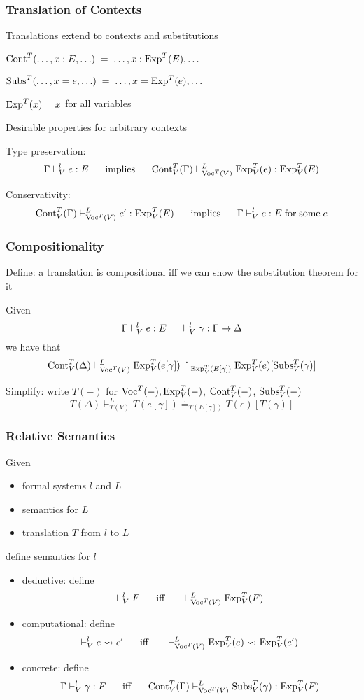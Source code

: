 \begin{frame}\frametitle{Translation of Contexts}
\begin{blockitems}{Translations extend to contexts and substitutions}
 \item $\mathrm{Cont}^T(\ldots,x:E,\ldots) \;=\;\ldots, x:\mathrm{Exp}^T(E), \ldots$
 \item $\mathrm{Subs}^T(\ldots,x=e,\ldots) \;=\;\ldots, x=\mathrm{Exp}^T(e), \ldots$
 \item $\mathrm{Exp}^T(x)=x$ for all variables
\end{blockitems}

\begin{blockitems}{Desirable properties for arbitrary contexts}
\item Type preservation:
\[\Gamma\vdash^l_V e:E \hspace*{.5cm}\;\mathrm{implies}\;\hspace*{.5cm} \mathrm{Cont}^T_V(\Gamma)\vdash^L_{\mathrm{Voc}^T(V)} \mathrm{Exp}^T_V(e):\mathrm{Exp}^T_V(E)\]
\item Conservativity:
\[\mathrm{Cont}^T_V(\Gamma)\vdash^L_{\mathrm{Voc}^T(V)} e':\mathrm{Exp}^T_V(E) \hspace*{.5cm}\;\mathrm{implies}\;\hspace*{.5cm} \Gamma\vdash^l_V e:E \;\mathrm{for}\;\mathrm{some}\; e\]
\end{blockitems}
\end{frame}

\begin{frame}\frametitle{Compositionality}
Define: a translation is compositional iff we can show the substitution theorem for it

Given
\[\Gamma\vdash^l_V e:E \hspace*{.5cm}\vdash^l_V \gamma:\Gamma\to\Delta\]
we have that
\[\mathrm{Cont}^T_V(\Delta)\vdash^L_{\mathrm{Voc}^T(V)}\mathrm{Exp}^T_V(e[\gamma])\doteq_{\mathrm{Exp}^T_V(E[\gamma])}\mathrm{Exp}^T_V(e)[\mathrm{Subs}^T_V(\gamma)] \]

Simplify: write
$T(-)$ for $\mathrm{Voc}^T(-), \mathrm{Exp}_V^T(-)$, $\mathrm{Cont}_V^T(-)$, $\mathrm{Subs}_V^T(-)$
\[T(\Delta)\vdash^L_{T(V)}T(e[\gamma])\doteq_{T(E[\gamma])}T(e)[T(\gamma)] \]
\end{frame}

\begin{frame}\frametitle{Relative Semantics}
Given
 \begin{itemize}
 \item formal systems $l$ and $L$
 \item semantics for $L$
 \item translation $T$ from $l$ to $L$
 \end{itemize}
define semantics for $l$
\medskip

\begin{itemize}
\item deductive: define
 \[\vdash^l_V F \hspace*{.5cm}\;\mathrm{iff}\;\hspace*{.5cm} \vdash^L_{\mathrm{Voc}^T(V)} \mathrm{Exp}^T_V(F) \]
\item computational: define
 \[\vdash^l_V e\rightsquigarrow e' \hspace*{.5cm}\;\mathrm{iff}\;\hspace*{.5cm} \vdash^L_{\mathrm{Voc}^T(V)}\mathrm{Exp}^T_V(e)\rightsquigarrow \mathrm{Exp}^T_V(e')\]
\item concrete: define
 \[\Gamma\vdash^l_V \gamma:F \hspace*{.5cm}\;\mathrm{iff}\;\hspace*{.5cm} \mathrm{Cont}^T_V(\Gamma)\vdash^L_{\mathrm{Voc}^T(V)}\mathrm{Subs}^T_V(\gamma):\mathrm{Exp}^T_V(F)\]
\end{itemize}
\end{frame}



